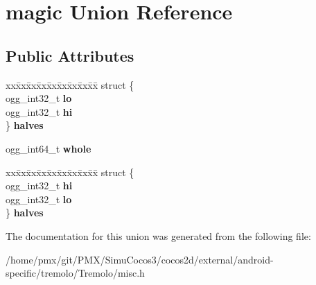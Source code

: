 \hypertarget{unionmagic}{}\section{magic Union Reference}
\label{unionmagic}
\subsection*{Public Attributes}
\begin{DoxyCompactItemize}
\item 
\mbox{\label{unionmagic_a30c38412dbd6f0e5a2a69614ba07d516}} 
\begin{tabbing}
xx\=xx\=xx\=xx\=xx\=xx\=xx\=xx\=xx\=\kill
struct \{\\
\>ogg\_int32\_t {\bfseries lo}\\
\>ogg\_int32\_t {\bfseries hi}\\
\} {\bfseries halves}\\

\end{tabbing}\item 
\mbox{\label{unionmagic_af221b2589a20378777e2fdf9c46167db}} 
ogg\+\_\+int64\+\_\+t {\bfseries whole}
\item 
\mbox{\label{unionmagic_a026458871a1969e86d6d6a8365d738dd}} 
\begin{tabbing}
xx\=xx\=xx\=xx\=xx\=xx\=xx\=xx\=xx\=\kill
struct \{\\
\>ogg\_int32\_t {\bfseries hi}\\
\>ogg\_int32\_t {\bfseries lo}\\
\} {\bfseries halves}\\

\end{tabbing}\end{DoxyCompactItemize}


The documentation for this union was generated from the following file\+:\begin{DoxyCompactItemize}
\item 
/home/pmx/git/\+P\+M\+X/\+Simu\+Cocos3/cocos2d/external/android-\/specific/tremolo/\+Tremolo/misc.\+h\end{DoxyCompactItemize}
